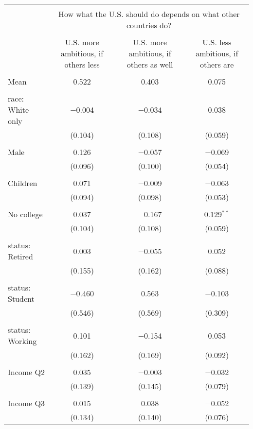 
\begin{tabular}{@{\extracolsep{5pt}}lccc} 
\\[-1.8ex]\hline 
\hline \\[-1.8ex] 
 & \multicolumn{3}{c}{How what the U.S. should do depends on what other countries do?} \\ 
\cline{2-4} 
\\[-1.8ex] & U.S. more ambitious, if others less & U.S. more ambitious, if others as well & U.S. less ambitious, if others are \\ 
\hline \\[-1.8ex] 
 Mean & 0.522 & 0.403 & 0.075  \\ \hline \\[-1.8ex] race: White only & $-$0.004 & $-$0.034 & 0.038 \\ 
  & (0.104) & (0.108) & (0.059) \\ 
  & & & \\ 
 Male & 0.126 & $-$0.057 & $-$0.069 \\ 
  & (0.096) & (0.100) & (0.054) \\ 
  & & & \\ 
 Children & 0.071 & $-$0.009 & $-$0.063 \\ 
  & (0.094) & (0.098) & (0.053) \\ 
  & & & \\ 
 No college & 0.037 & $-$0.167 & 0.129$^{**}$ \\ 
  & (0.104) & (0.108) & (0.059) \\ 
  & & & \\ 
 status: Retired & 0.003 & $-$0.055 & 0.052 \\ 
  & (0.155) & (0.162) & (0.088) \\ 
  & & & \\ 
 status: Student & $-$0.460 & 0.563 & $-$0.103 \\ 
  & (0.546) & (0.569) & (0.309) \\ 
  & & & \\ 
 status: Working & 0.101 & $-$0.154 & 0.053 \\ 
  & (0.162) & (0.169) & (0.092) \\ 
  & & & \\ 
 Income Q2 & 0.035 & $-$0.003 & $-$0.032 \\ 
  & (0.139) & (0.145) & (0.079) \\ 
  & & & \\ 
 Income Q3 & 0.015 & 0.038 & $-$0.052 \\ 
  & (0.134) & (0.140) & (0.076) \\ 

\end{tabular}
